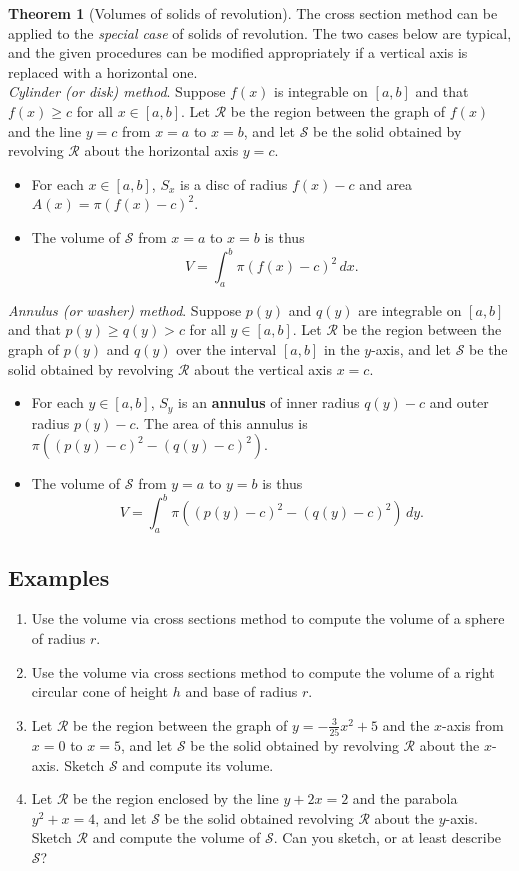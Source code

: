 \documentclass[11pt]{article}
\theoremstyle{definition}
\theoremstyle{named}
\newtheorem*{namedtheorem}{Theorem}
\numberwithin{myalgctr}{section}
\begin{document}
\begin{namedtheorem}[Volumes of solids of revolution] The cross section method can be applied to the {\em special case} of solids of revolution. The two cases below are typical, and the given procedures can be modified appropriately if a vertical axis is replaced with a horizontal one.
\vspace{.1in}
\\
{\em Cylinder (or disk) method}. Suppose $f(x)$ is integrable on $[a,b]$ and that $f(x)\geq c$ for all $x\in [a,b]$. Let $\mathcal{R}$ be the region between the graph of $f(x)$ and the line $y=c$ from $x=a$ to $x=b$, and let $\mathcal{S}$ be the solid obtained by revolving $\mathcal{R}$ about the horizontal axis $y=c$.
\begin{itemize}
  \item For each $x\in [a,b]$, $S_x$ is a disc of radius $f(x)-c$ and area $A(x)=\pi(f(x)-c)^2$.
  \item The volume of $\mathcal{S}$ from $x=a$ to $x=b$ is thus
  \[
  V=\int_a^b \pi(f(x)-c)^2\, dx.
  \]
\end{itemize}
{\em Annulus (or washer) method}. Suppose $p(y)$ and $q(y)$ are integrable on $[a,b]$ and that $p(y)\geq q(y)> c$ for all $y\in [a,b]$. Let $\mathcal{R}$ be the region between the graph of $p(y)$ and $q(y)$ over the interval $[a,b]$ in the $y$-axis, and let $\mathcal{S}$ be the solid obtained by revolving $\mathcal{R}$ about the vertical axis $x=c$.
\begin{itemize}
  \item For each $y\in [a,b]$, $S_y$ is an {\bf annulus} of inner radius $q(y)-c$ and outer radius $p(y)-c$. The area of this annulus is $\pi((p(y)-c)^2-(q(y)-c)^2)$.
  \item The volume of $\mathcal{S}$ from $y=a$ to $y=b$ is thus
  \[
  V=\int_a^b \pi((p(y)-c)^2-(q(y)-c)^2)\, dy.
  \]
\end{itemize}
\end{namedtheorem}

\subsection*{Examples}
\begin{enumerate}
  \item Use the volume via cross sections method to compute the volume of a sphere of radius $r$.
  \item Use the volume via cross sections method to compute the volume of a right circular cone of height $h$ and base of radius $r$.
  \item Let $\mathcal{R}$ be the region between the graph of $y=-\frac{3}{25}x^2+5$ and the $x$-axis from $x=0$ to $x=5$, and let $\mathcal{S}$ be the solid obtained by revolving $\mathcal{R}$ about the $x$-axis. Sketch $\mathcal{S}$ and compute its volume.
  \item Let $\mathcal{R}$ be the region enclosed by the line $y+2x=2$ and the parabola $y^2+x=4$, and let $\mathcal{S}$ be the solid obtained revolving $\mathcal{R}$ about the $y$-axis. Sketch $\mathcal{R}$ and compute the volume of $\mathcal{S}$. Can you sketch, or at least describe $\mathcal{S}$?
\end{enumerate}
\end{document}
